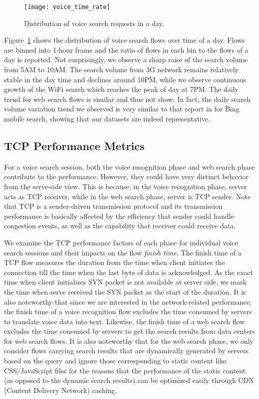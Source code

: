 \begin{figure}[th]
\centering
\texttt{[image: voice\_time\_rate]}
\caption{Distribution of voice search requests in a day.}
\label{fig:voice_time_rate}
\end{figure}

Figure~\ref{fig:voice_time_rate} shows the distribution of voice search flows over time of a day. Flows are binned into 1-hour frame and the ratio of flows in each bin to the flows of a day is reported. Not surprisingly, we observe a sharp raise of the search volume from 5AM to 10AM. The search volume from 3G network remains relatively stable in the day time and declines around 10PM, while we observe continuous growth of the WiFi search which reaches the peak of day at 7PM. The daily trend for web search flows is similar and thus not show. In fact, the daily search volume variation trend we observed is very similar to that report in \cite{Song:2013:EEU:2488388.2488493} for Bing mobile search, showing that our datasets are indeed representative.

\subsection{TCP Performance Metrics}

For a voice search session, both the voice recognition phase and web search phase contribute to the performance. However, they could have very distinct behavior from the serve-side view. This is because, in the voice recognition phase, server acts as TCP receiver, while in the web search phase, server is TCP sender. Note that TCP is a sender-driven transmission protocol and its transmission performance is basically affected by the efficiency that sender could handle congestion events, as well as the capability that receiver could receive data.

We examine the TCP performance factors of each phase for individual voice search sessions and their impacts on the flow \emph{finish time}. The finish time of a TCP flow measures the duration from the time when client initiates the connection till the time when the last byte of data is acknowledged. As the exact time when client initializes SYN packet is not available at server side, we mark the time when serve received the SYN packet as the start of the duration. It is also noteworthy that since we are interested in the network-related performance, the finish time of a voice recognition flow excludes the time consumed by servers to translate voice data into text. Likewise, the finish time of a web search flow excludes the time consumed by servers to get the search results from data centers for web search flows. It is also noteworthy that for the web search phase, we only consider flows carrying search results that are dynamically generated by servers based on the query and ignore those corresponding to static content like CSS/JavaScript files for the reasons that the performance of the static content (as opposed to the dynamic search results) can be optimized easily through CDN (Content Delivery Network) caching.

